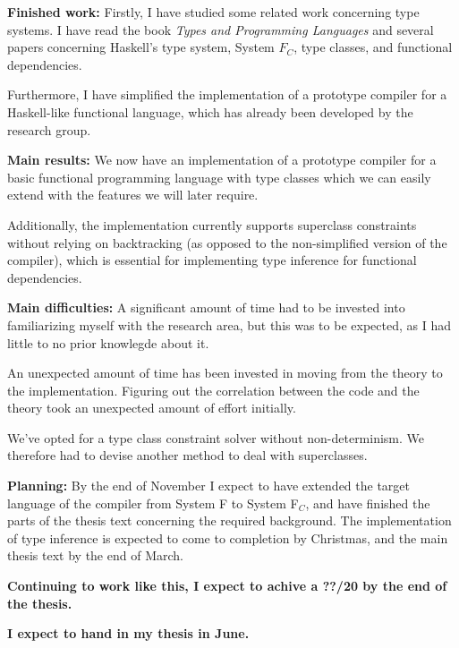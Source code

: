 \documentclass[12pt]{report}
\begin{document}
\vspace{1cm}
{\bf Finished work:}
Firstly, I have studied some related work concerning type systems. I have read
the book \textit{Types and Programming Languages} and several papers concerning
Haskell's type system, System $F_C$, type classes, and functional dependencies.

Furthermore, I have simplified the implementation of a prototype compiler for a
Haskell-like functional language, which has already been developed by the
research group.


\vspace{1cm}
{\bf Main results:}
We now have an implementation of a prototype compiler for a basic functional
programming language with type classes which we can easily extend with the
features we will later require.

Additionally, the implementation currently supports superclass constraints
without relying on backtracking (as opposed to the non-simplified version of
the compiler), which is essential for implementing type inference for
functional dependencies.

\vspace{1cm}
{\bf Main difficulties:}
A significant amount of time had to be invested into familiarizing myself with
the research area, but this was to be expected, as I had little to no prior
knowlegde about it.

An unexpected amount of time has been invested in moving from the theory to the
implementation. Figuring out the correlation between the code and the theory
took an unexpected amount of effort initially.

We've opted for a type class constraint solver without non-determinism. We
therefore had to devise another method to deal with superclasses.

\vspace{1cm}
{\bf Planning:}
By the end of November I expect to have extended the target language of the
compiler from System F to System F$_C$, and have finished the parts of the
thesis text concerning the required background. The implementation of type
inference is expected to come to completion by Christmas, and the main thesis
text by the end of March.


\vspace{1cm}
{\bf Continuing to work like this, I expect to achive a ??/20 by the end of the
thesis.}

{\bf I expect to hand in my thesis in June.}
\end{document}
